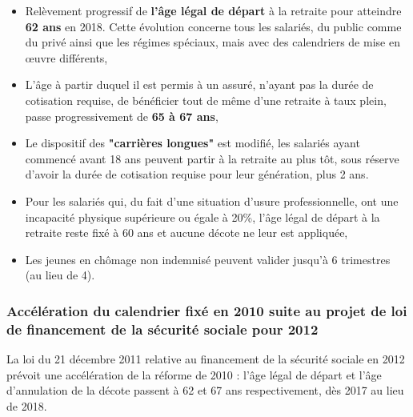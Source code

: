 \begin{itemize}
	\item  Relèvement progressif de \textbf{l'âge légal de départ} à 
la retraite pour atteindre \textbf{62 ans} en 2018. Cette évolution 
concerne tous les salariés, du public comme du privé ainsi 
que les régimes spéciaux, mais avec des calendriers de mise 
en œuvre différents,
	\item   L'âge à partir duquel il est permis à un assuré, 
n'ayant pas la durée de cotisation requise, de bénéficier 
tout de même d'une retraite à taux plein, passe 
progressivement de \textbf{65 à 67 ans},
	\item   Le dispositif des \textbf{"carrières longues"} est modifié, 
les salariés ayant commencé avant 18 ans peuvent partir à la 
retraite au plus tôt, sous réserve d'avoir la durée de 
cotisation requise pour leur génération, plus 2 ans.
	\item   Pour les salariés qui, du fait d'une situation 
d'usure professionnelle, ont une incapacité physique 
supérieure ou égale à 20\%, l'âge légal de départ à la 
retraite reste fixé à 60 ans et aucune décote ne leur est 
appliquée,
	\item   Les jeunes en chômage non indemnisé peuvent 
valider jusqu'à 6 trimestres (au lieu de 4).
\end{itemize}

\subsubsection{Accélération du calendrier fixé en 2010 suite au projet de loi de financement de la sécurité sociale pour 2012}
La loi du 21 décembre 2011 relative au financement de la sécurité sociale en 2012 prévoit une accélération de la réforme de 2010 : l'âge légal de départ et l'âge d'annulation de la décote passent à 62 et 67 ans respectivement, dès 2017 au lieu de 2018.

